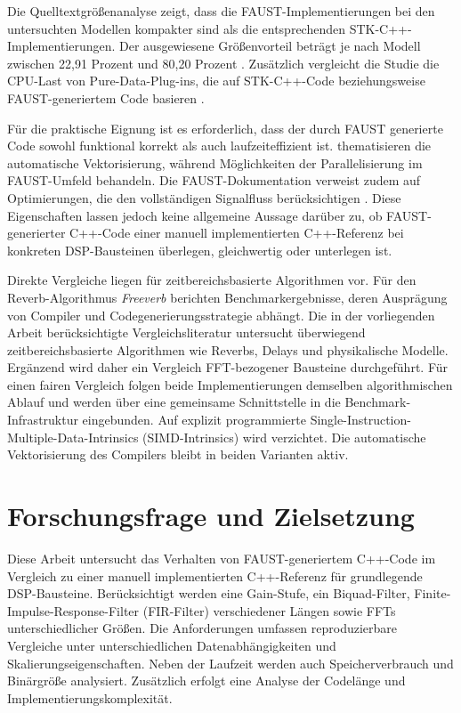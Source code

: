 Die Quelltextgrößenanalyse zeigt, dass die FAUST-Implementierungen bei den
untersuchten Modellen kompakter sind als die entsprechenden STK-C++-
Implementierungen. Der ausgewiesene Größenvorteil beträgt je nach Modell
zwischen 22,91 Prozent und 80,20 Prozent
\parencite[Tab.~1, S.~6]{michon2011fauststk}. 
Zusätzlich vergleicht die Studie
die CPU-Last von Pure-Data-Plug-ins, die auf STK-C++-Code beziehungsweise
FAUST-generiertem Code basieren \parencite[Tab.~2, S.~6]{michon2011fauststk}.

Für die praktische Eignung ist es erforderlich, dass der durch FAUST generierte Code sowohl funktional korrekt als auch laufzeiteffizient ist.
\textcite{scaringella:hal-02158949} thematisieren die automatische Vektorisierung, während \textcite{letz:hal-02158924} Möglichkeiten der Parallelisierung im FAUST-Umfeld behandeln. 
Die FAUST-Dokumentation verweist zudem auf Optimierungen, die den vollständigen Signalfluss berücksichtigen \parencite{orlarey:hal-02159014}. Diese Eigenschaften lassen jedoch keine allgemeine Aussage darüber zu, ob FAUST-generierter C++-Code einer manuell implementierten C++-Referenz bei konkreten DSP-Bausteinen überlegen, gleichwertig oder unterlegen ist.

Direkte Vergleiche liegen für zeitbereichsbasierte Algorithmen vor. Für den Reverb-Algorithmus \emph{Freeverb} berichten \textcite{orlarey:hal-02159014} Benchmarkergebnisse, deren Ausprägung von Compiler und
Codegenerierungsstrategie abhängt. Die in der vorliegenden Arbeit berücksichtigte Vergleichsliteratur untersucht überwiegend zeitbereichsbasierte Algorithmen wie Reverbs, Delays und physikalische Modelle. Ergänzend wird daher ein Vergleich FFT-bezogener Bausteine durchgeführt.
Für einen fairen Vergleich folgen beide Implementierungen demselben algorithmischen Ablauf und werden über eine gemeinsame Schnittstelle in die Benchmark-Infrastruktur eingebunden. Auf explizit programmierte Single-Instruction-Multiple-Data-Intrinsics (SIMD-Intrinsics) wird verzichtet.
Die automatische Vektorisierung des Compilers bleibt in beiden Varianten aktiv.

\section{Forschungsfrage und Zielsetzung}
\label{sec:forschungsfrage}
Diese Arbeit untersucht das Verhalten von FAUST-generiertem C++-Code im Vergleich zu einer manuell implementierten C++-Referenz für grundlegende DSP-Bausteine. Berücksichtigt werden eine Gain-Stufe, ein Biquad-Filter, Finite-Impulse-Response-Filter (FIR-Filter) verschiedener Längen sowie FFTs unterschiedlicher Größen. Die Anforderungen umfassen reproduzierbare Vergleiche unter unterschiedlichen Datenabhängigkeiten und Skalierungseigenschaften. Neben der Laufzeit werden auch Speicherverbrauch und Binärgröße analysiert. Zusätzlich erfolgt eine Analyse der Codelänge und Implementierungskomplexität.

